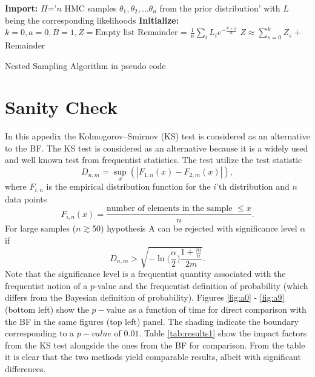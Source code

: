 \documentclass[fleqn,usenatbib,nofootinbib]{revtex4-2}
\begin{document}
\begin{appendices}
		\vspace{5mm} %
		\begin{algorithm}[H]
			\label{alg:NS}
			{\bf Import:} $\Pi$='$n$ HMC samples $\theta_1,\theta_2,\dots \theta_n$ from the prior distribution' with $L$ being the corresponding likelihoods\;	
			{\bf Initialize:} $k=0, a=0,B = 1, Z = \text{Empty list}$\;		
			Remainder = $\frac{1}{n}\sum_iL_ie^{-\frac{k+1}{n}}$\;
			$Z \approx \sum_{s=0}^kZ_s+$Remainder\;
			\caption{Nested Sampling Algorithm in pseudo code}
		\end{algorithm}
		\vspace{5mm} %
		
		
		\section{Sanity Check}
		\label{app:sanity}
		In this appedix the Kolmogorov–Smirnov (KS) test is considered as an alternative to the BF. The KS test is considered as an alternative because it is a widely used and well known test from frequentist statistics. The test utilize the test statistic
		\begin{equation}
			D_{n,m} = \sup_x( | F_{1,n}(x)-F_{2,m}(x) | ), 
		\end{equation}
		where $F_{i,n}$ is the empirical distribution function for the $i$'th distribution and $n$ data points
		\begin{equation}
			F_{i,n}(x)=\frac{\text{number of elements in the sample } \leq x}{n}.
		\end{equation}
		For large samples ($n \gtrsim 50$) hypothesis A can be rejected with significance level $\alpha$ if
		\begin{equation}
			D_{n,m} > \sqrt{-\ln\bigg(\frac{\alpha}{2}\bigg)\frac{1+\frac{m}{n}}{2m}}.
		\end{equation}
		Note that the significance level is a frequentist quantity associated with the frequentist notion of a $p$-value and the frequentist definition of probability (which differs from the Bayesian definition of probability). Figures \ref{fig:a0} - \ref{fig:a9} (bottom left) show the $p-$value as a function of time for direct comparison with the BF in the same figures (top left) panel. The shading indicate the boundary corresponding to a $p-value$ of $0.01$. Table \ref{tab:results1} show the impact factors from the KS test alongside the ones from the BF for comparison. From the table it is clear that the two methods yield comparable results, albeit with significant differences.
		

\end{appendices}
\end{document}
